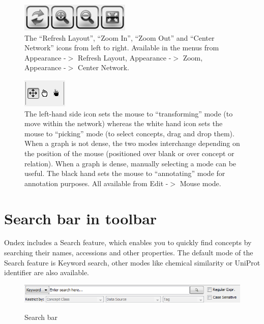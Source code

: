 \begin{figure}[H]
\centering
\includegraphics[scale=0.9]{images/Oct12/icon_refresh_zoom2_center.png} 
\caption{The ``Refresh Layout'', ``Zoom In'', ``Zoom Out'' and ``Center Network'' icons from left to right.
Available in the menus from Appearance -$>$ Refresh Layout, Appearance -$>$ Zoom, Appearance -$>$ Center Network.}
\label{fig:icon_refresh_zoom2_center}
\end{figure}

\begin{figure}[H]
\centering
\includegraphics[scale=0.9]{images/Oct12/icon_mouse_modes.png} 
\caption{The left-hand side icon sets the mouse to ``transforming'' mode (to move within the network) whereas the
white hand icon sets the mouse to ``picking'' mode (to select concepts, drag and drop them).
When a graph is not dense, the two modes interchange depending on the position of the mouse (positioned over blank or over concept or relation).
When a graph is dense, manually selecting a mode can be useful.
The black hand sets the mouse to ``annotating'' mode for annotation purposes.
All available from Edit -$>$ Mouse mode.}
\label{fig:icon_mouse_modes}
\end{figure}


\section{Search bar in toolbar}
\label{sec:ref_search}
Ondex includes a Search feature, which enables you to quickly find concepts by searching their names, accessions and other properties. 
The default mode of the Search feature is Keyword search, other modes like chemical similarity or UniProt identifier are also available.

\begin{figure}[H]
\centering
\includegraphics[scale=0.7]{images/Oct12/search_bar.png} 
\label{fig:search_bar}
\caption{Search bar}
\end{figure}

